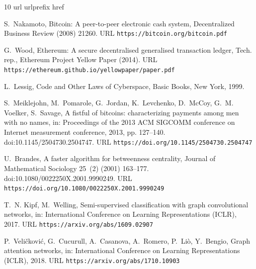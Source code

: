 \documentclass[final,5p,times]{elsarticle}
\begin{document}
\begin{thebibliography}{10}
\expandafter\ifx\csname url\endcsname\relax
  \def\url#1{\texttt{#1}}\fi
\expandafter\ifx\csname urlprefix\endcsname\relax\def\urlprefix{URL }\fi
\expandafter\ifx\csname href\endcsname\relax
  \def\href#1#2{#2} \def\path#1{#1}\fi

S.~Nakamoto, \href{https://bitcoin.org/bitcoin.pdf}{Bitcoin: A peer-to-peer electronic cash system}, Decentralized Business Review (2008) 21260.
\newline\urlprefix\url{https://bitcoin.org/bitcoin.pdf}

G.~Wood, \href{https://ethereum.github.io/yellowpaper/paper.pdf}{Ethereum: A secure decentralised generalised transaction ledger}, Tech. rep., Ethereum Project Yellow Paper (2014).
\newline\urlprefix\url{https://ethereum.github.io/yellowpaper/paper.pdf}

L.~Lessig, Code and Other Laws of Cyberspace, Basic Books, New York, 1999.

S.~Meiklejohn, M.~Pomarole, G.~Jordan, K.~Levchenko, D.~McCoy, G.~M. Voelker, S.~Savage, \href{https://doi.org/10.1145/2504730.2504747}{A fistful of bitcoins: characterizing payments among men with no names}, in: Proceedings of the 2013 ACM SIGCOMM conference on Internet measurement conference, 2013, pp. 127--140.
\newblock \href {https://doi.org/10.1145/2504730.2504747} {\path{doi:10.1145/2504730.2504747}}.
\newline\urlprefix\url{https://doi.org/10.1145/2504730.2504747}

U.~Brandes, \href{https://doi.org/10.1080/0022250X.2001.9990249}{A faster algorithm for betweenness centrality}, Journal of Mathematical Sociology 25~(2) (2001) 163--177.
\newblock \href {https://doi.org/10.1080/0022250X.2001.9990249} {\path{doi:10.1080/0022250X.2001.9990249}}.
\newline\urlprefix\url{https://doi.org/10.1080/0022250X.2001.9990249}

T.~N. Kipf, M.~Welling, \href{https://arxiv.org/abs/1609.02907}{Semi-supervised classification with graph convolutional networks}, in: International Conference on Learning Representations (ICLR), 2017.
\newline\urlprefix\url{https://arxiv.org/abs/1609.02907}

P.~Veli{\v{c}}kovi{\'c}, G.~Cucurull, A.~Casanova, A.~Romero, P.~Li{\`o}, Y.~Bengio, \href{https://arxiv.org/abs/1710.10903}{Graph attention networks}, in: International Conference on Learning Representations (ICLR), 2018.
\newline\urlprefix\url{https://arxiv.org/abs/1710.10903}


\end{thebibliography}
\end{document}
